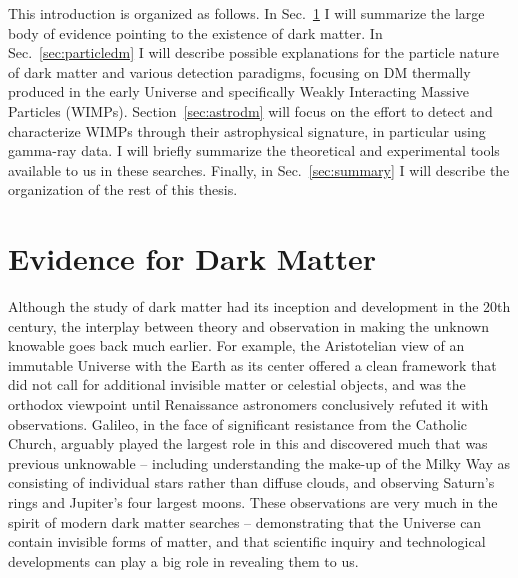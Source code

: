 This introduction is organized as follows. In Sec.~\ref{sec:evidence} I will summarize the large body of evidence pointing to the existence of dark matter. In Sec.~\ref{sec:particledm} I will describe possible explanations for the particle nature of dark matter and various detection paradigms, focusing on DM thermally produced in the early Universe and specifically Weakly Interacting Massive Particles (WIMPs). Section~\ref{sec:astrodm} will focus on the effort to detect and characterize WIMPs through their astrophysical signature, in particular using gamma-ray data. I will briefly summarize the theoretical and experimental tools available to us in these searches. Finally, in Sec.~\ref{sec:summary} I will describe the organization of the rest of this thesis. %

\section{Evidence for Dark Matter}
\label{sec:evidence}

Although the study of dark matter had its inception and development in the 20th century, the interplay between theory and observation in making the unknown knowable goes back much earlier. For example, the Aristotelian view of an immutable Universe with the Earth as its center offered a clean framework that did not call for additional invisible matter or celestial objects, and was the orthodox viewpoint until Renaissance astronomers conclusively refuted it with observations. Galileo, in the face of significant resistance from the Catholic Church, arguably played the largest role in this and discovered much that was previous unknowable -- including understanding the make-up of the Milky Way as consisting of individual stars rather than diffuse clouds, and observing Saturn's rings and Jupiter's four largest moons. These observations are very much in the spirit of modern dark matter searches -- demonstrating that the Universe can contain invisible forms of matter, and that scientific inquiry and technological developments can play a big role in revealing them to us.


